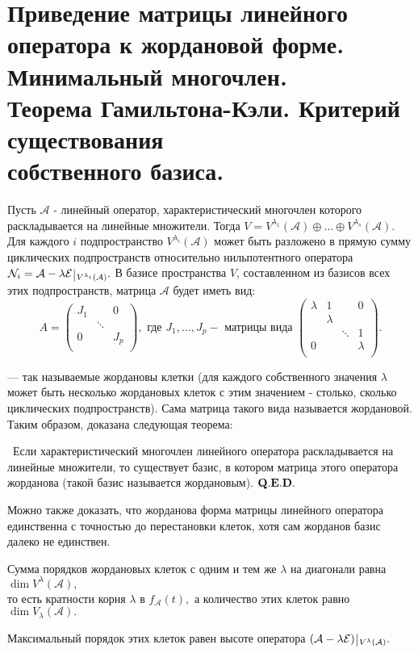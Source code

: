 \documentclass[draft]{article}%
\newcommand{\ab}{\par\noindent}%
\newcommand{\te}{\par\noindent{\bf Теорема.}\ }%
\newcommand{\qed}{\quad${{\bf Q.E.D.}}$}
\newcommand{\ps}{\oplus}
\newcommand{\op}[1]{$\mathcal{#1}$}
\newcommand{\om}[1]{\mathcal{#1}}
\begin{document}
\section{Приведение матрицы линейного оператора к жордановой форме. Минимальный многочлен.\\ Теорема Гамильтона-Кэли. Критерий существования\\ собственного базиса.}
\label{q35} %
\ab Пусть \op{A} - линейный оператор, характеристический многочлен которого раскладывается на линейные
множители. Тогда $V=V^{\lambda_1}(\om{A})\ps\dots\ps V^{\lambda_s}(\om{A}).$ Для каждого $i$ подпространство
$V^{\lambda_i}(\om{A})$ может быть разложено в прямую сумму циклических подпространств относительно
нильпотентного оператора $\om{N}_i=\om{A-\lambda E}\,\vrule\,_{V^{\lambda_i}(\om{A})}.$ В базисе
пространства $V$, составленном из базисов всех этих подпространств, матрица \op{A} будет иметь вид:
$$
A=\left(%
\begin{array}{ccc}
  J_1 &  & 0 \\
   & \ddots &  \\
  0 &  & J_p \\
\end{array}%
\right),\mbox{\ где\ }J_1,\dots,J_p - \mbox{\ матрицы вида\ } \left(%
\begin{array}{cccc}
  \lambda & 1 &  & 0 \\
   & \lambda &  &  \\
   &  & \ddots & 1 \\
  0 &  &  & \lambda \\
\end{array}%
\right).
$$
\ab --- так называемые жордановы клетки (для каждого собственного значения $\lambda$ может быть несколько
жордановых клеток с этим значением - столько, сколько циклических подпространств). Сама матрица такого вида
называется жордановой. Таким образом, доказана следующая теорема: %
\te Если характеристический многочлен линейного оператора раскладывается на линейные множители, то существует
базис, в котором матрица этого оператора жорданова (такой базис называется жордановым). \qed%
\ab Можно также доказать, что жорданова форма матрицы линейного оператора единственна с точностью до
перестановки клеток, хотя сам жорданов базис далеко не единствен. %
\ab Сумма порядков жордановых клеток с одним и тем же $\lambda$ на диагонали равна $\dim V^\lambda(\om{A}),$\\ то
есть кратности корня $\lambda$ в $f_\om{A}(t),$ а количество этих клеток равно $\dim V_\lambda(\om{A}).$ %
\ab Максимальный порядок этих клеток равен высоте оператора $(\om{A-\lambda E})\,\vrule\,_{V^\lambda(\om{A})}.$
\end{document}
